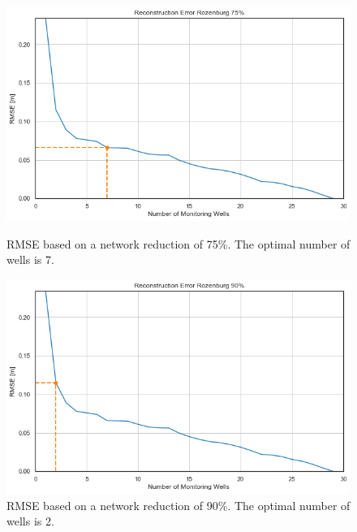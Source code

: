 \begin{figure}[htbp]
    \centering
    \begin{minipage}{0.48\textwidth}
        \includegraphics[width=\linewidth]{frontmatter/Rozenburg-fig/new75.png}
        \caption{RMSE based on a network reduction of 75\%. The optimal number of wells is 7.}
        \label{roz75}
    \end{minipage}\hfill
    \begin{minipage}{0.48\textwidth}
        \includegraphics[width=\linewidth]{frontmatter/Rozenburg-fig/new90.png}
        \caption{RMSE based on a network reduction of 90\%. The optimal number of wells is 2.}
        \label{roz90}
    \end{minipage}
\end{figure}
